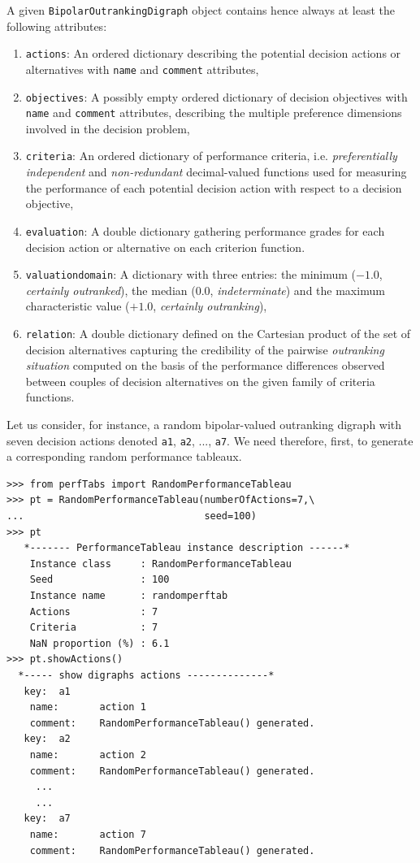 A given \texttt{BipolarOutrankingDigraph} object contains hence always at least the following attributes:
\begin{enumerate}
\item \texttt{actions}: An ordered dictionary describing the potential decision actions or alternatives with {\tt name} and {\tt comment} attributes,
\item \texttt{objectives}: A possibly empty ordered dictionary of decision objectives with {\tt name} and {\tt comment} attributes, describing the multiple preference dimensions involved in the decision problem, 
\item \texttt{criteria}: An ordered dictionary of performance criteria, i.e. {\em preferentially independent\/} and {\em non-redundant\/} decimal-valued functions used for measuring the performance of each potential decision action with respect to a decision objective,
\item \texttt{evaluation}: A double dictionary gathering performance grades for each decision action or alternative on each criterion function. 
\item \texttt{valuationdomain}: A dictionary with three entries: the minimum ($-1.0$, \emph{certainly outranked}), the median ($0.0$, \emph{indeterminate}) and the maximum characteristic value ($+1.0$, \emph{certainly outranking}),
\item \texttt{relation}: A double dictionary defined on the Cartesian product of the set of decision alternatives capturing the credibility of the pairwise \emph{outranking situation} computed on the basis of the performance differences observed between couples of decision alternatives on the given family of criteria functions.   
\end{enumerate}

Let us consider, for instance, a random bipolar-valued outranking digraph with seven decision actions denoted \texttt{a1}, \texttt{a2}, ..., \texttt{a7}. We need therefore, first, to generate a corresponding random performance tableaux.
\begin{lstlisting}[caption={Generating a random performance tableau.},label=list:3.1]
>>> from perfTabs import RandomPerformanceTableau
>>> pt = RandomPerformanceTableau(numberOfActions=7,\
...                               seed=100)   
>>> pt
   *------- PerformanceTableau instance description ------*
    Instance class     : RandomPerformanceTableau
    Seed               : 100
    Instance name      : randomperftab
    Actions            : 7
    Criteria           : 7
    NaN proportion (%) : 6.1
>>> pt.showActions()
  *----- show digraphs actions --------------*
   key:  a1
    name:       action 1
    comment:    RandomPerformanceTableau() generated.
   key:  a2
    name:       action 2
    comment:    RandomPerformanceTableau() generated.
     ...
     ...
   key:  a7
    name:       action 7
    comment:    RandomPerformanceTableau() generated.
\end{lstlisting}

